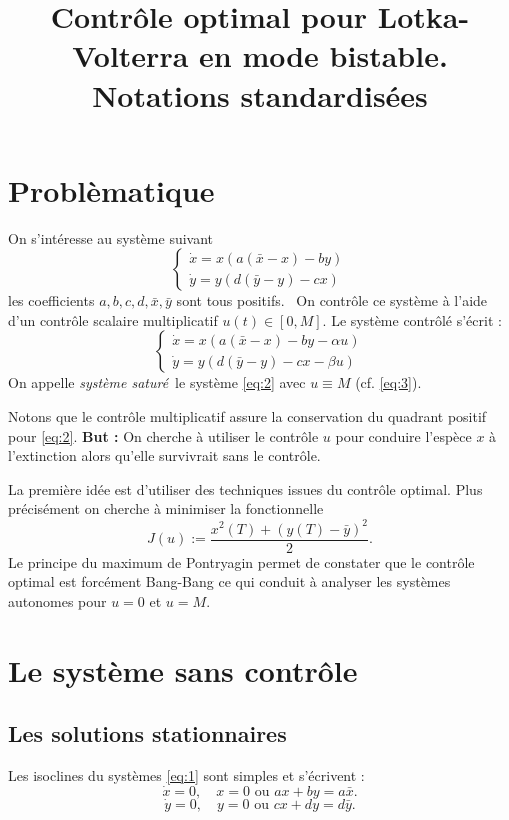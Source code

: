 \documentclass[a4paper,11pt,draft]{article}
\title{Contrôle optimal pour Lotka-Volterra en mode bistable. Notations standardisées}
\author{}
\date{}
\begin{document}
\maketitle

\section{Problèmatique}
\label{sec:1}

On s'intéresse au système suivant
\begin{equation} \label{eq:1}
    \begin{cases}
        \dot{x}=x(a(\bar{x}-x)-by)\\
        \dot{y}=y(d(\bar{y}-y)-cx)
    \end{cases}
\end{equation}
les coefficients $a,b,c,d,\bar{x}, \bar{y}$ sont tous positifs.
\
On contrôle ce système à l'aide d'un contrôle scalaire multiplicatif $u(t)\in [0,M]$. Le système contrôlé s'écrit :
\begin{equation} \label{eq:2}
    \begin{cases}
        \dot{x}=x(a(\bar{x}-x)-by-\alpha u)\\
        \dot{y}=y(d(\bar{y}-y)-cx-\beta u)
    \end{cases}
\end{equation}
On appelle {\it système saturé}\ le système \eqref{eq:2} avec $u\equiv M$ (cf. \eqref{eq:3}).

Notons que le contrôle multiplicatif assure la conservation du quadrant positif pour \eqref{eq:2}.
{\bf But : } On cherche à utiliser le contrôle $u$ pour conduire l'espèce $x$ à l'extinction
alors qu'elle survivrait sans le contrôle.

La première idée est d'utiliser des techniques issues du contrôle optimal. Plus précisément on
cherche à minimiser la fonctionnelle
\begin{equation}
    J(u):=\frac{x^2(T) + (y(T)-\bar{y})^2}{2}.
\end{equation}
Le principe du maximum de Pontryagin permet de constater que le contrôle optimal est forcément
Bang-Bang ce qui conduit à analyser les systèmes autonomes pour $u=0$ et $u=M$.

\section{Le système sans contrôle}
\subsection{Les solutions stationnaires}
Les isoclines du systèmes \eqref{eq:1} sont simples et s'écrivent :
$$\dot{x}=0, \quad x=0\text{ ou } ax+by=a\bar{x}.$$
$$\dot{y}=0, \quad y=0\text{ ou } cx+dy=d\bar{y}.$$
\end{document}
